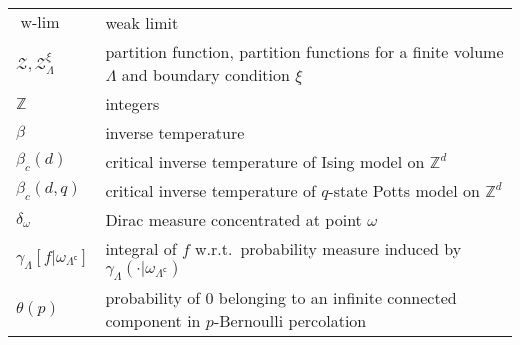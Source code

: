 \documentclass[12pt]{article}
\newcommand{\Z}{\mathbb{Z}}
\newcommand{\ZZ}{\mathcal{Z}}
\newcommand{\pika}{\boldsymbol{\cdot}}
\newcommand{\1}{\mathbbm{1}}
\renewcommand{\c}{\mathsf{c}}
\newcommand{\5}{\vspace{0.5cm}}
\theoremstyle{definition}
\begin{document}
\begin{tabular}{p{4cm}p{10cm}}
$\text{w-}\lim$ & weak limit \\
$\ZZ,\ZZ_\Lambda^\xi$ & partition function, partition functions for a finite volume $\Lambda$ and boundary condition $\xi$ \\
$\Z$ & integers \\
$\beta$ & inverse temperature \\
$\beta_c(d)$ & critical inverse temperature of Ising model on $\Z^d$ \\
$\beta_c(d,q)$ & critical inverse temperature of $q$-state Potts model on $\Z^d$ \\
$\delta_\omega$ & Dirac measure concentrated at point $\omega$ \\
$\gamma_\Lambda[f|\omega_{\Lambda^\c}]$  & integral of $f$ w.r.t.~probability measure induced by $\gamma_\Lambda(\pika|\omega_{\Lambda^\c})$ \\
$\theta(p)$ & probability of $0$ belonging to an infinite connected component in $p$-Bernoulli percolation
\end{tabular}

\pagebreak
\end{document}
